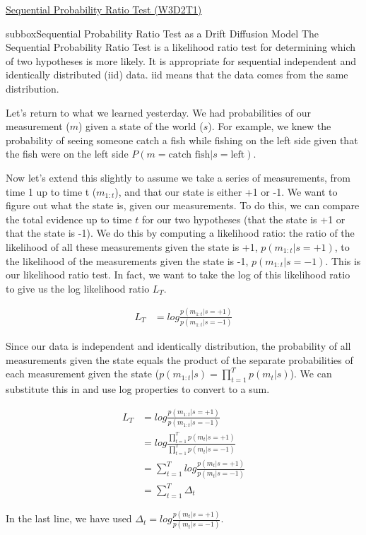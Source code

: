\begin{textbox}{\href{https://compneuro.neuromatch.io/tutorials/W3D2_HiddenDynamics/student/W3D2_Tutorial1.html}{Sequential Probability Ratio Test (W3D2T1)}   }


\begin{subbox}{subbox}{Sequential Probability Ratio Test as a Drift Diffusion Model}
\scriptsize
The Sequential Probability Ratio Test is a likelihood ratio test for determining which of two hypotheses is more likely. It is appropriate for sequential independent and identically distributed (iid) data. iid means that the data comes from the same distribution.

Let's return to what we learned yesterday. We had probabilities of our measurement ($m$) given a state of the world ($s$). For example, we knew the probability of seeing someone catch a fish while fishing on the left side given that the fish were on the left side $P(m = \textrm{catch fish} | s = \textrm{left})$.

Now let's extend this slightly to assume we take a series of measurements, from time 1 up to time t ($m_{1:t}$), and that our state is either +1 or -1. We want to figure out what the state is, given our measurements. To do this, we can compare the total evidence up to time $t$ for our two hypotheses (that the state is +1 or that the state is -1). We do this by computing a likelihood ratio: the ratio of the likelihood of all these measurements given the state is +1, $p(m_{1:t}|s=+1)$, to the likelihood of the measurements given the state is -1, $p(m_{1:t}|s=-1)$. This is our likelihood ratio test. In fact, we want to take the log of this likelihood ratio to give us the log likelihood ratio $L_T$.

\begin{align*}
L_T &= log\frac{p(m_{1:t}|s=+1)}{p(m_{1:t}|s=-1)}
\end{align*}

Since our data is independent and identically distribution, the probability of all measurements given the state equals the product of the separate probabilities of each measurement given the state ($p(m_{1:t}|s) = \prod_{t=1}^T p(m_t | s) $). We can substitute this in and use log properties to convert to a sum.

\begin{align*}
L_T &= log\frac{p(m_{1:t}|s=+1)}{p(m_{1:t}|s=-1)}\\
&= log\frac{\prod_{t=1}^Tp(m_{t}|s=+1)}{\prod_{t=1}^Tp(m_{t}|s=-1)}\\
&= \sum_{t=1}^T log\frac{p(m_{t}|s=+1)}{p(m_{t}|s=-1)}\\
&= \sum_{t=1}^T \Delta_t
\end{align*}

In the last line, we have used $\Delta_t = log\frac{p(m_{t}|s=+1)}{p(m_{t}|s=-1)}$. 
\end{subbox}



\end{textbox}

